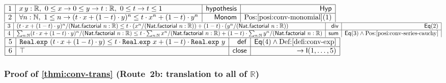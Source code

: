 \documentclass[11pt,reqno]{amsart}
\providecommand{\R}{\mathbb{R}}
\theoremstyle{redplain}
\numberwithin{equation}{section}
\begin{document}
\begin{center}
$%
\begin{array}{|c|l|r|r|}
\hline
1 & x\,y:\mathbb{R},\ 0\leq x\rightarrow 0\leq y\rightarrow t:\mathbb{R},\
0\leq t\rightarrow t\leq 1 & \mathsf{hypothesis} & \mathsf{Hyp} \\ \hline
2 & \forall n:\mathbb{N},\ 1\leq n\rightarrow (t\cdot x+(1-t)\cdot
y)^{n}\leq t\cdot x^{n}+(1-t)\cdot y^{n} & \mathsf{Monom} & %
\mbox{Pos:\ref{posi:conv-monomial}(1)}%
\end{array}%
$ \noindent $%
\begin{array}{|c|l|r|r|}
\hline
3 & (t\cdot x+(1-t)\cdot y)^{n}/(\mathsf{Nat.factorial}\ n:\mathbb{R})\leq
t\cdot (x^{n}/(\mathsf{Nat.factorial}\ n:\mathbb{R}))+(1-t)\cdot (y^{n}/(%
\mathsf{Nat.factorial}\ n:\mathbb{R})) & \mathsf{div} & \mathsf{Eq}(2) \\ 
\hline
4 & \sum_{n:\mathbb{N}}(t\cdot x+(1-t)\cdot y)^{n}/(\mathsf{Nat.factorial}\
n:\mathbb{R})\leq t\cdot \sum_{n:\mathbb{N}}x^{n}/(\mathsf{Nat.factorial}\ n:%
\mathbb{R})+(1-t)\cdot \sum_{n:\mathbb{N}}y^{n}/(\mathsf{Nat.factorial}\ n:%
\mathbb{R}) & \mathsf{sum} & \mathsf{Eq}(3)\wedge\mbox{Pos:%
\ref{posi:conv-series-cauchy}}%
\end{array}%
$ \noindent $%
\begin{array}{|c|l|r|r|}
\hline
5 & \mathtt{Real.exp}\ (t\cdot x+(1-t)\cdot y)\leq t\cdot \mathtt{Real.exp}\
x+(1-t)\cdot \mathtt{Real.exp}\ y & \mathsf{def} & \mathsf{Eq}(4)\wedge %
\mbox{Def:\ref{defi:conv-exp}} \\ \hline
6 & \top & \mathsf{close} & \rightarrow \mathsf{I}(1,\dots ,5) \\ \hline
\end{array}%
$
\end{center}

\subsubsection*{Proof of \autoref{thmi:conv-trans} (Route~2b: translation to
all of \texorpdfstring{$\R$}{R})}
\end{document}
